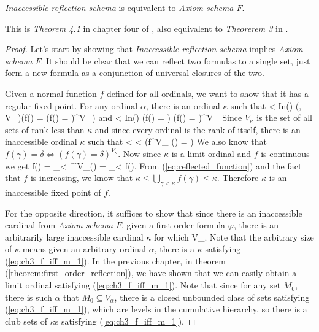 \begin{theorem}
\emph{Inaccessible reflection schema} is equivalent to \emph{Axiom schema $F$}.
\end{theorem}

This is \emph{Theorem 4.1} in chapter four of \cite{DrakeBook}, also equivalent to \emph{Theorerem 3} in \cite{Levy1960a}.
\begin{proof}
Let's start by showing that \emph{Inaccessible reflection schema} implies \emph{Axiom schema $F$}. 
It should be clear that we can reflect two formulas to a single set, just form a new formula as a conjunction of universal closures of the two.

Given a normal function $f$ defined for all ordinals, we want to show that it has a regular fixed point. 
For any ordinal $\alpha$, there is an ordinal $\kappa$ such that 
\beq
\alpha < \kappa \et In(\kappa) \et (\forall \gamma, \delta \in V_\kappa)(f(\gamma) = \delta \iff (f(\gamma) = \delta)^{V_\kappa})
\eeq
and
\beq
\alpha < \kappa \et In(\kappa) \et \forall \gamma \exists \delta (f(\gamma) = \delta) \iff (\forall \gamma \exists \delta f(\gamma) = \delta)^{V_\kappa}
\eeq
Since $V_\kappa$ is the set of all sets of rank less than $\kappa$ and since every ordinal is the rank of itself, there is an inaccessible ordinal $\kappa$ such that
\beq
\forall \gamma < \kappa \exists \delta < \kappa (f^{V_\kappa} (\gamma) = \delta)\label{eq:reflected_function}
\eeq
We also know that $f(\gamma) = \delta \iff (f(\gamma) = \delta)^{V_\kappa}$. 
Now since $\kappa$ is a limit ordinal and $f$ is continuous we get
\beq
f(\kappa) = \bigcup_{\gamma < \kappa} f^{V_\kappa}(\gamma) = \bigcup_{\gamma < \kappa} f(\gamma)\mbox{.}
\eeq
From (\ref{eq:reflected_function}) and the fact that $f$ is increasing, we know that $\kappa \leq \bigcup_{\gamma < \kappa} f(\gamma) \leq \kappa$. Therefore $\kappa$ is an inaccessible fixed point of $f$.

For the opposite direction, it suffices to show that since there is an inaccessible cardinal from \emph{Axiom schema $F$}, given a first-order formula $\varphi$, there is an arbitrarily large inaccessible cardinal $\kappa$ for which 
\beq
\varphi \iff V_\kappa \models \varphi\mbox{.}\label{eq:ch3_f_iff_m_1}
\eeq
Note that the arbitrary size of $\kappa$ means given an arbitrary ordinal $\alpha$, there is a $\kappa$ satisfying (\ref{eq:ch3_f_iff_m_1}).
In the previous chapter, in theorem (\ref{theorem:first_order_reflection}), we have shown that we can easily obtain a limit ordinal satisfying (\ref{eq:ch3_f_iff_m_1}). Note that since for any set $M_0$, there is such $\alpha$ that $M_0 \subseteq V_\alpha$, there is a closed unbounded class of sets satisfying (\ref{eq:ch3_f_iff_m_1}), which are levels in the cumulative hierarchy, so there is a club sets of $\kappa$s satisfying (\ref{eq:ch3_f_iff_m_1}).


\end{proof}

